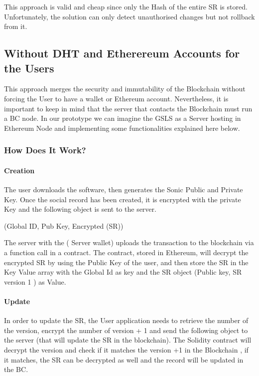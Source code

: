 This approach is valid and cheap since only the Hash of the entire SR is stored.
Unfortunately, the solution can only detect unauthorised changes but not rollback from it.

\subsection{Without DHT and Etherereum Accounts for the Users}
This approach merges the security and immutability of the Blockchain without forcing the User to have a wallet or Ethereum account. Nevertheless, it is important to keep in mind that the server that contacts the Blockchain must run a BC node. In our prototype we can imagine the GSLS as a Server hosting in Ethereum Node and implementing some functionalities explained here below.

\subsubsection{How Does It Work?}

\paragraph{Creation}

The user downloads the software, then generates the Sonic Public and Private Key. Once the social record has been created, it is encrypted with the private Key and the following object is sent to the server.

(Global ID, Pub Key, Encrypted (SR))

The server with the ( Server wallet) uploads the transaction to the blockchain via a function call in a contract. The contract, stored in Ethereum, will decrypt the encrypted SR by using the Public Key of the user,  and then store the SR in the Key Value array with the Global Id as key and the SR object (Public key, SR version 1 ) as Value.

\paragraph{Update}

In order to update the SR, the User application needs to retrieve the number of the version, encrypt the number of version + 1 and send the following object to the server (that will update the SR in the blockchain). The Solidity contract will decrypt the version and check if it matches the version +1 in the Blockchain , if it matches, the SR can be decrypted as well and the record will be updated in the BC.

